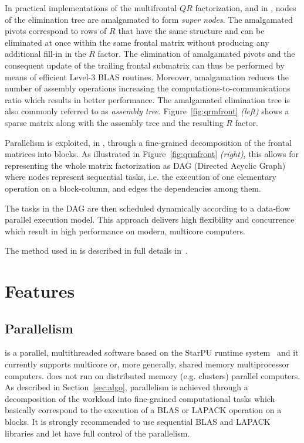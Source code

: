 \documentclass[11pt]{article}
\begin{document}
In practical implementations of the multifrontal $QR$ factorization,
and in \qrm, nodes of the elimination tree are amalgamated to form
{\it super nodes}. The amalgamated pivots correspond to rows of $R$
that have the same structure and can be eliminated at once within the
same frontal matrix without producing any additional fill-in in the
$R$ factor. The elimination of amalgamated pivots and the consequent
update of the trailing frontal submatrix can thus be performed by
means of efficient Level-3 BLAS routines. Moreover, amalgamation
reduces the number of assembly operations increasing the
computations-to-communications ratio which results in better
performance. The amalgamated elimination tree is also commonly
referred to as {\it assembly tree}. Figure~\ref{fig:qrmfront} {\it
  (left)} shows a sparse matrix along with the assembly tree and the
resulting $R$ factor.

Parallelism is exploited, in \qrm, through a fine-grained
decomposition of the frontal matrices into blocks. As
illustrated in Figure~\ref{fig:qrmfront} {\it (right)}, this allows
for representing the whole matrix factorization as DAG (Directed Acyclic
Graph) where nodes represent sequential tasks, i.e. the execution of
one elementary operation on a block-column, and edges the dependencies
among them. 

The tasks in the DAG are then scheduled dynamically according to a
data-flow parallel execution model. This approach delivers high
flexibility and concurrence which result in high performance on
modern, multicore computers.  

The method used in \qrm is described in full details
in~\cite{butt:11,a.b.g.l:16}. 

\section{Features}
\subsection{Parallelism}
\label{sec:parallelism}
\qrm is a parallel, multithreaded software based on the StarPU runtime
system~\cite{a.t.n.w:11} and it currently supports multicore or, more
generally, shared memory multiprocessor computers. \qrm does not run
on distributed memory (e.g. clusters) parallel computers. As described
in Section~\ref{sec:algo}, parallelism is achieved through a
decomposition of the workload into fine-grained computational tasks
which basically correspond to the execution of a BLAS or LAPACK
operation on a blocks. It is strongly recommended to use sequential
BLAS and LAPACK libraries and let \qrm have full control of the
parallelism.
\end{document}
